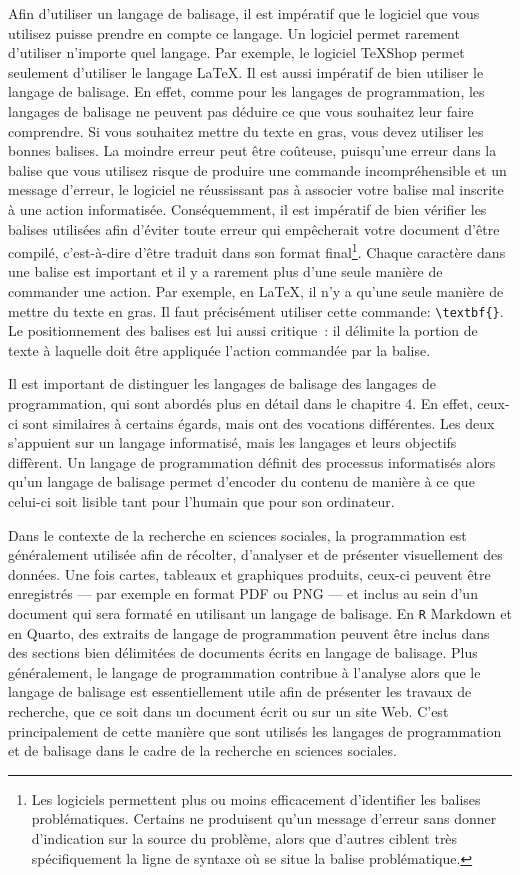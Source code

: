 \documentclass[
  letterpaper,
]{scrbook}
\begin{document}
Afin d'utiliser un langage de balisage, il est impératif que le logiciel
que vous utilisez puisse prendre en compte ce langage. Un logiciel
permet rarement d'utiliser n'importe quel langage. Par exemple, le
logiciel \TeX{}Shop permet seulement d'utiliser le langage \LaTeX. Il
est aussi impératif de bien utiliser le langage de balisage. En effet,
comme pour les langages de programmation, les langages de balisage ne
peuvent pas déduire ce que vous souhaitez leur faire comprendre. Si vous
souhaitez mettre du texte en gras, vous devez utiliser les bonnes
balises. La moindre erreur peut être coûteuse, puisqu'une erreur dans la
balise que vous utilisez risque de produire une commande
incompréhensible et un message d'erreur, le logiciel ne réussissant pas
à associer votre balise mal inscrite à une action informatisée.
Conséquemment, il est impératif de bien vérifier les balises utilisées
afin d'éviter toute erreur qui empêcherait votre document d'être
compilé, c'est-à-dire d'être traduit dans son format final\footnote{Les
  logiciels permettent plus ou moins efficacement d'identifier les
  balises problématiques. Certains ne produisent qu'un message d'erreur
  sans donner d'indication sur la source du problème, alors que d'autres
  ciblent très spécifiquement la ligne de syntaxe où se situe la balise
  problématique.}. Chaque caractère dans une balise est important et il
y a rarement plus d'une seule manière de commander une action. Par
exemple, en \LaTeX, il n'y a qu'une seule manière de mettre du texte en
gras. Il faut précisément utiliser cette commande:
\texttt{\textbackslash{}textbf\{\}}. Le positionnement des balises est
lui aussi critique~: il délimite la portion de texte à laquelle doit
être appliquée l'action commandée par la balise.

Il est important de distinguer les langages de balisage des langages de
programmation, qui sont abordés plus en détail dans le chapitre 4. En
effet, ceux-ci sont similaires à certains égards, mais ont des vocations
différentes. Les deux s'appuient sur un langage informatisé, mais les
langages et leurs objectifs diffèrent. Un langage de programmation
définit des processus informatisés alors qu'un langage de balisage
permet d'encoder du contenu de manière à ce que celui-ci soit lisible
tant pour l'humain que pour son ordinateur.

Dans le contexte de la recherche en sciences sociales, la programmation
est généralement utilisée afin de récolter, d'analyser et de présenter
visuellement des données. Une fois cartes, tableaux et graphiques
produits, ceux-ci peuvent être enregistrés --- par exemple en format PDF
ou PNG --- et inclus au sein d'un document qui sera formaté en utilisant
un langage de balisage. En \texttt{R} Markdown et en Quarto, des
extraits de langage de programmation peuvent être inclus dans des
sections bien délimitées de documents écrits en langage de balisage.
Plus généralement, le langage de programmation contribue à l'analyse
alors que le langage de balisage est essentiellement utile afin de
présenter les travaux de recherche, que ce soit dans un document écrit
ou sur un site Web. C'est principalement de cette manière que sont
utilisés les langages de programmation et de balisage dans le cadre de
la recherche en sciences sociales.
\end{document}
